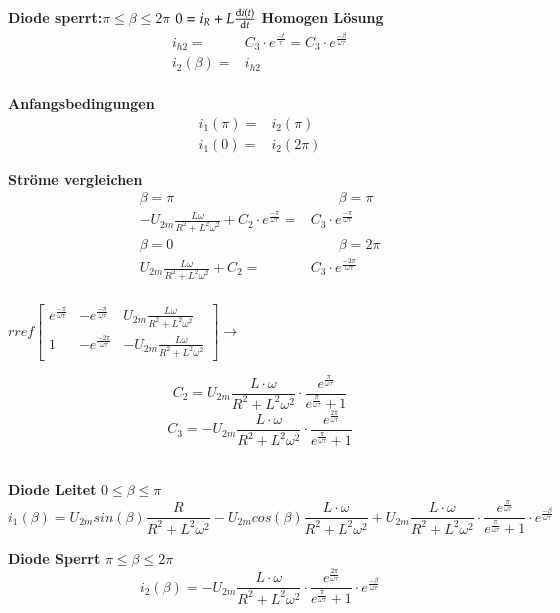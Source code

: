 \textbf{Diode sperrt:}$ \pi \leq \beta \leq 2\pi$\newline
$0 = i_R + L\frac{\mathop{}\!\mathrm{d} i(t)}{\mathop{}\!\mathrm{d} t}$\newline
\textbf{Homogen Lösung}
\begin{align*}
i_{h2} = & C_3 \cdot e^{\frac{-t}{\tau}} = C_3 \cdot e^{\frac{-\beta}{\omega \tau}}\\
i_2(\beta) = & i_{h2}
\end{align*}
\\
\textbf{Anfangsbedingungen}
\begin{align*}
    i_1(\pi) = & i_2(\pi)\\
    i_1(0)  = & i_2(2\pi)
\end{align*}

\textbf{Ströme vergleichen}
\begin{align*}
    \beta = \pi \qquad & \qquad \beta = \pi\\
    - U_{2m} \frac{L\omega}{R^2 + L^2\omega^2} + C_2 \cdot e^{\frac{-\pi}{\omega \tau}} = & C_3 \cdot e^{\frac{-\pi}{\omega \tau}}\\
    \beta = 0 \qquad & \qquad \beta = 2\pi\\
    U_{2m} \frac{L\omega}{R^2 + L^2\omega^2} + C_2  = & C_3 \cdot e^{\frac{-2\pi}{\omega \tau}}\\  
\end{align*}
\begin{minipage}{7cm}
    $rref
    \begin{bmatrix}
    e^{\frac{-\pi}{\omega \tau}}       &-e^{\frac{-\pi}{\omega \tau}}  & U_{2m} \frac{L\omega}{R^2 + L^2\omega^2} \\ 
    1& -e^{\frac{-2\pi}{\omega \tau}}         & -U_{2m} \frac{L\omega}{R^2 + L^2\omega^2}
    \end{bmatrix} 
    \rightarrow$ 
\end{minipage}
\begin{minipage}{5cm}
    \[ C_2 = U_{2m} \frac{L \cdot \omega}{R^2 + L^2\omega^2} \cdot  \frac{e^{\frac{\pi}{\omega \tau}}}{e^{\frac{\pi}{\omega \tau}} +1} \]
    \[ C_3 = -U_{2m} \frac{L \cdot \omega}{R^2 + L^2\omega^2} \cdot  \frac{e^{\frac{2\pi}{\omega \tau}}}{e^{\frac{\pi}{\omega \tau}} +1} \]
\end{minipage}
\\
\textbf{Diode Leitet} $ 0 \leq \beta \leq \pi $\newline
\[ i_{1}(\beta) =  U_{2m} sin(\beta) \frac{R}{R^2 + L^2\omega^2} - U_{2m} cos(\beta) \frac{L \cdot \omega}{R^2 + L^2\omega^2} + U_{2m} \frac{L \cdot \omega}{R^2 + L^2\omega^2} \cdot  \frac{e^{\frac{\pi}{\omega \tau}}}{e^{\frac{\pi}{\omega \tau}} +1} \cdot e^{\frac{-\beta}{\omega \tau}} \]

\textbf{Diode Sperrt} $ \pi \leq \beta \leq 2\pi $\newline
\[ i_2(\beta) = -U_{2m} \frac{L \cdot \omega}{R^2 + L^2\omega^2} \cdot  \frac{e^{\frac{2\pi}{\omega \tau}}}{e^{\frac{\pi}{\omega \tau}} +1} \cdot e^{\frac{-\beta}{\omega \tau}} \]
\clearpage












